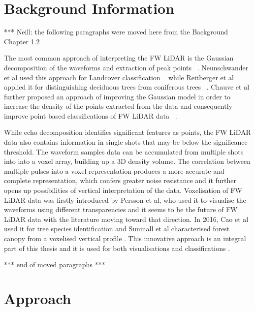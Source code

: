 \documentclass{subfiles}
\begin{document}
\section{Background Information}
		\par {\color{red} *** Neill: the following paragraphs were moved here from the Background Chapter 1.2}
		
		\par The most common approach of interpreting the FW LiDAR is the Gaussian decomposition of the waveforms and extraction of peak points ~\cite{Wanger2006}. Neunschwander et al used this approach for Landcover classification ~\cite{Neuenschwander2009} while Reitberger et al applied it for distinguishing deciduous trees from coniferous trees ~\cite{Reitberger2008}. Chauve et al further proposed an approach of improving the Gaussian model in order to increase the density of the points extracted from the data and consequently improve point based classifications of FW LiDAR data ~\cite{Chauve2007}. 
		
		\par While echo decomposition identifies significant features as points, the FW LiDAR data also contains information in single shots that may be below the significance threshold. The waveform samples data can be accumulated from multiple shots into {\color{blue} into a voxel array, building up a 3D density volume. The correlation between multiple pulses into a voxel representation produces a more accurate and complete representation, which confers greater noise resistance and it further opens up possibilities of vertical interpretation of the data.} Voxelisation {\color{blue} of FW LiDAR data} was firstly introduced by Persson et al, who used it to visualise the waveforms using different transparencies \cite{Persson2005} and it seems to be the future of FW LiDAR data with the literature moving toward that direction. In 2016, Cao et al used it for tree species identification \cite{Cao2016} and Sunmall et al characterised forest canopy from a voxelised vertical profile \cite{Sumnall2016}. This innovative approach is an integral part of this thesis and it is used for both visualisations and classifications \cite{Miltiadou2014}\cite{Miltiadou2015}. 
		\par {\color{red} *** end of moved paragraphs *** }
		
		

	
\section{Approach}
\end{document}
